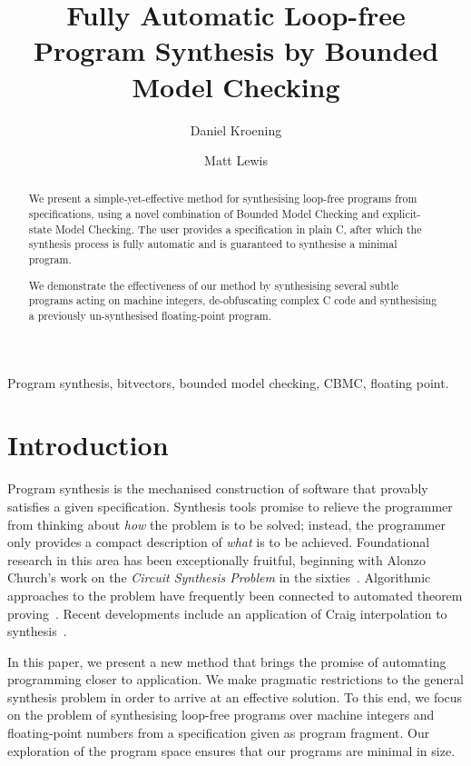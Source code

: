 \documentclass[a4paper]{llncs}
\title{Fully Automatic Loop-free Program Synthesis by Bounded Model Checking}
\author{Daniel Kroening \and Matt Lewis}
\institute{University of Oxford}
\newenvironment{keywords}{
       \list{}{\advance\topsep by0.35cm\relax\small
       \leftmargin=0cm
       \labelwidth=0.35cm
       \listparindent=0.35cm
       \itemindent\listparindent
       \rightmargin\leftmargin}\item[\hskip\labelsep
                                     \bfseries Keywords:]}
     {\endlist}
\begin{document}
%
\maketitle
%
\pagestyle{headings}  %

\begin{abstract}

We present a simple-yet-effective method for synthesising loop-free programs
from specifications, using a novel combination of Bounded Model Checking and
explicit-state Model Checking.  The user provides a specification in plain
C, after which the synthesis process is fully automatic and is guaranteed to
synthesise a minimal program.

We demonstrate the effectiveness of our method by synthesising several subtle
programs acting on machine integers, de-obfuscating complex C code and
synthesising a previously un-synthesised floating-point program.
\end{abstract}


\begin{keywords}
 Program synthesis, bitvectors, bounded model checking, CBMC,
 floating point.
\end{keywords}

\section{Introduction}

Program synthesis is the mechanised construction of software that provably
satisfies a given specification.  Synthesis tools promise to relieve the
programmer from thinking about \emph{how} the problem is to be solved;
instead, the programmer only provides a compact description of \emph{what}
is to be achieved.  Foundational research in this area has been
exceptionally fruitful, beginning with Alonzo Church's work on the
\emph{Circuit Synthesis Problem} in the sixties~\cite{church-synth}.
Algorithmic approaches to the problem have frequently been connected to
automated theorem proving~\cite{manna-waldinger,proof-planning}.
Recent developments include an application of Craig interpolation
to synthesis~\cite{synth-interpolants}.

In this paper, we present a new method that brings the promise of
automating programming closer to application.  We make pragmatic
restrictions to the general synthesis problem in order to arrive at an
effective solution.  To this end, we focus on the problem of synthesising
loop-free programs over machine integers and floating-point numbers from a
specification given as program fragment.  Our exploration of the program
space ensures that our programs are minimal in size.
\end{document}
